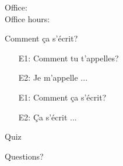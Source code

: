\documentclass{beamer}
\subtitle[Il y a, c'est, ce sont]{Il y a, c'est, ce sont}
\begin{document}
  \begin{frame}
    \titlepage
    \tiny{Office: \\
          Office hours: }
  \end{frame}

  \begin{frame}{Comment ça s'écrit? }
    \begin{itemize}
      \item[E1:] Comment tu t'appelles?
      \item[E2:] Je m'appelle ...
      \item[E1:] Comment ça s'écrit?
      \item[E2:] Ça s'écrit ...
    \end{itemize}
  \end{frame}

  \begin{frame}{}
    \begin{center}
      \Large Quiz
    \end{center}
  \end{frame}

  \begin{frame}{}
    \begin{center}
      \Large Questions?
    \end{center}
  \end{frame}
\end{document}
